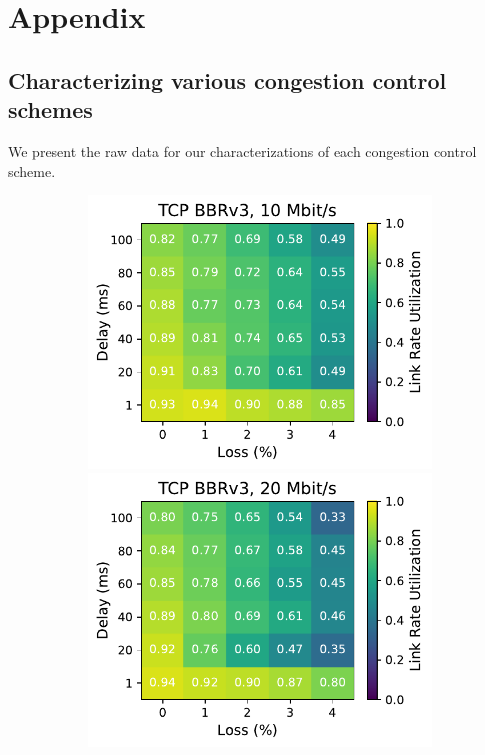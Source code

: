 \chapter{Appendix}

\section{Characterizing various congestion control schemes}
\label{sec:appendix:heatmaps}

We present the raw data for our characterizations of each
congestion control scheme.

\begin{figure}[ht]
    \centering
    \begin{subfigure}[b]{0.22\linewidth}
        \includegraphics[width=\linewidth,trim={0 0 2cm 0},clip]{splitting-paper/figures/heatmaps/heatmap_tcp_bbr3_10mbps.pdf}
        \includegraphics[width=\linewidth,trim={0 0 2cm 0},clip]{splitting-paper/figures/heatmaps/heatmap_tcp_bbr3_20mbps.pdf}

\end{subfigure}
\end{figure}
